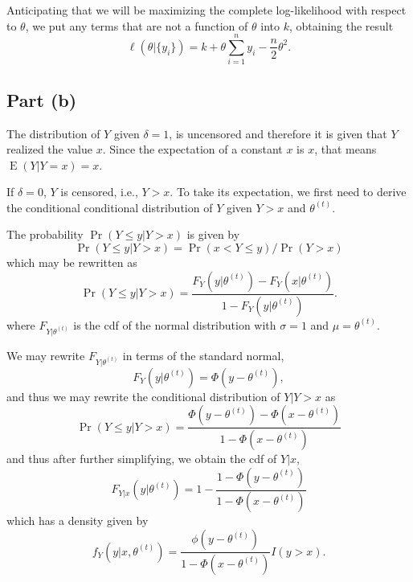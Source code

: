 \documentclass[
]{article}
\begin{document}
Anticipating that we will be maximizing the complete log-likelihood with
respect to \(\theta\), we put any terms that are not a function of
\(\theta\) into \(k\), obtaining the result \[
  \ell(\theta | \{y_i\}) = k + \theta \sum_{i=1}^{n} y_i - \frac{n}{2} \theta^2.
\]

\hypertarget{part-b}{%
\subsection{Part (b)}\label{part-b}}


The distribution of \(Y\) given \(\delta = 1\), is uncensored and
therefore it is given that \(Y\) realized the value \(x\). Since the
expectation of a constant \(x\) is \(x\), that means
\(\operatorname{E}(Y | Y = x) = x\).

If \(\delta = 0\), \(Y\) is censored, i.e., \(Y > x\). To take its
expectation, we first need to derive the conditional conditional
distribution of \(Y\) given \(Y > x\) and \(\theta^{(t)}\).

The probability \(\Pr(Y \leq y | Y > x)\) is given by \[
  \Pr(Y \leq y | Y > x) = \Pr(x < Y \leq y) / \Pr(Y > x)
\] which may be rewritten as \[
  \Pr(Y \leq y | Y > x) = \frac{F_Y(y | \theta^{(t)}) - F_Y(x | \theta^{(t)})}{1 - F_Y(y | \theta^{(t)})}.
\] where \(F_{Y|\theta^{(t)}}\) is the cdf of the normal distribution
with \(\sigma=1\) and \(\mu=\theta^{(t)}\).

We may rewrite \(F_{Y|\theta^{(t)}}\) in terms of the standard normal,
\[
  F_{Y}(y|\theta^{(t)}) = \Phi(y - \theta^{(t)}),
\] and thus we may rewrite the conditional distribution of \(Y | Y > x\)
as \[
  \Pr(Y \leq y | Y > x) = \frac{\Phi(y - \theta^{(t)}) - \Phi(x - \theta^{(t)})}{1 - \Phi(x - \theta^{(t)})}
\] and thus after further simplifying, we obtain the cdf of \(Y | x\),
\[
    F_{Y|x}(y|\theta^{(t)}) = 1 - \frac{1- \Phi(y - \theta^{(t)})}{1 - \Phi(x - \theta^{(t)})}
\] which has a density given by \[
    f_{Y}(y|x,\theta^{(t)}) = \frac{\phi(y - \theta^{(t)})}{1 - \Phi(x - \theta^{(t)})} I(y > x).
\]
\end{document}
